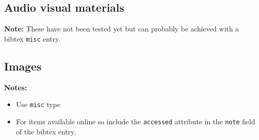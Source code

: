 \subsection{Audio visual materials}
\textbf{Note:} These have not been tested yet but can probably be achieved with a bibtex \verb#misc# entry.

\subsection{Images}
\label{sec:images}
\textbf{Notes:} 
\begin{itemize}
\item Use \texttt{misc} type
\item For items available online   so include the \texttt{accessed} attribute in the \texttt{note} field of the bibtex entry.
\end{itemize}

